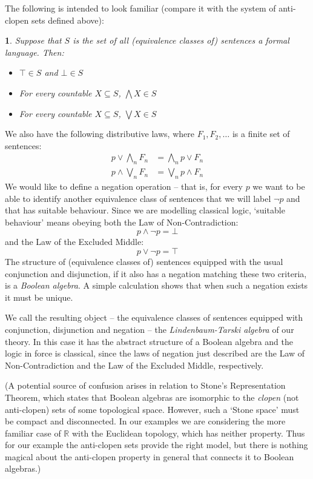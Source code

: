 \documentclass[oneside,english]{article}
\theoremstyle{plain}
\newtheorem{thm}{\protect\theoremname}
\theoremstyle{definition}
\theoremstyle{definition}
\providecommand{\theoremname}{Theorem}
\begin{document}
The following is intended to look familiar (compare it with the system of anti-clopen sets defined above):

\begin{thm}
	Suppose that $S$ is the set of all (equivalence classes of) sentences a formal language. Then:
	\begin{itemize}
		\item $\top\in S$ and $\bot\in S$
		\item For every countable $X\subseteq S$, $\bigwedge X\in S$
		\item For every countable $X\subseteq S$, $\bigvee X\in S$
	\end{itemize}
\end{thm}
We also have the following distributive laws, where $F_1, F_2, \dots$ is a finite set of sentences:
\[
	\begin{split}
		p\lor\bigwedge_n F_n &= \bigwedge_n p\lor F_n \\
		p\land\bigvee_n F_n &= \bigvee_n p\land F_n
	\end{split}
\]
We would like to define a negation operation -- that is, for every $p$ we want to be able to identify another equivalence class of sentences that we will label $\lnot p$ and that has suitable behaviour. Since we are modelling classical logic, `suitable behaviour' means obeying both the Law of Non-Contradiction:
\[
	p \land \lnot p = \bot
\]
and the Law of the Excluded Middle:
\[
	p \lor \lnot p = \top
\]
The structure of (equivalence classes of) sentences equipped with the usual conjunction and disjunction, if it also has a negation matching these two criteria, is a \emph{Boolean algebra}. A simple calculation shows that when such a negation exists it must be unique. 

We call the resulting object -- the equivalence classes of sentences equipped with conjunction, disjunction and negation -- the \emph{Lindenbaum-Tarski algebra} of our theory. In this case it has the abstract structure of a Boolean algebra and the logic in force is classical, since the laws of negation just described are the Law of Non-Contradiction and the Law of the Excluded Middle, respectively.

(A potential source of confusion arises in relation to Stone's Representation Theorem, which states that Boolean algebras are isomorphic to the \emph{clopen} (not anti-clopen) sets of some topological space. However, such a `Stone space' must be compact and disconnected. In our examples we are considering the more familiar case of $\mathbb{R}$ with the Euclidean topology, which has neither property. Thus for our example the anti-clopen sets provide the right model, but there is nothing magical about the anti-clopen property in general that connects it to Boolean algebras.)
\end{document}
